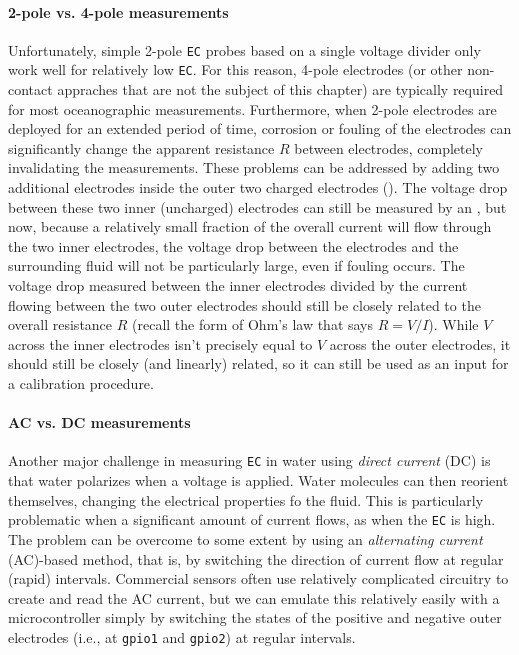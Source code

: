 \paragraph{2-pole vs. 4-pole measurements} Unfortunately, simple 2-pole \texttt{EC} probes based on a single voltage divider only work well for relatively low \texttt{EC}. For this reason, 4-pole electrodes (or other non-contact appraches that are not the subject of this chapter) are typically required for most oceanographic measurements. Furthermore, when 2-pole electrodes are deployed for an extended period of time, corrosion or fouling of the electrodes can significantly change the apparent resistance $R$ between electrodes, completely invalidating the measurements. These problems can be addressed by adding two additional electrodes inside the outer two charged electrodes (). The voltage drop between these two inner (uncharged) electrodes can still be measured by an \adc, but now, because a relatively small fraction of the overall current will flow through the two inner electrodes, the voltage drop between the electrodes and the surrounding fluid will not be particularly large, even if fouling occurs. The voltage drop measured between the inner electrodes divided by the current flowing between the two outer electrodes should still be closely related to the overall resistance $R$ (recall the form of Ohm's law that says $R = V/I$). While $V$ across the inner electrodes isn't precisely equal to $V$ across the outer electrodes, it should still be closely (and linearly) related, so it can still be used as an input for a calibration procedure.  

\paragraph{AC vs. DC measurements} Another major challenge in measuring \texttt{EC} in water using \emph{direct current} (DC) is that water polarizes when a voltage is applied. Water molecules can then reorient themselves, changing the electrical properties fo the fluid. This is particularly problematic when a significant amount of current flows, as when the \texttt{EC} is high. The problem can be overcome to some extent by using an \emph{alternating current} (AC)-based method, that is, by switching the direction of current flow at regular (rapid) intervals.  Commercial sensors often use relatively complicated circuitry to create and read the AC current, but we can emulate this relatively easily with a microcontroller simply by switching the states of the positive and negative outer electrodes (i.e., at \texttt{gpio1} and \texttt{gpio2}) at regular intervals.

